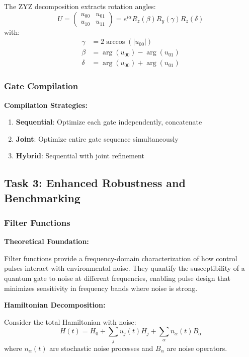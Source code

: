 \documentclass[11pt,a4paper]{article}
\theoremstyle{definition}
\theoremstyle{remark}
\begin{document}
The ZYZ decomposition extracts rotation angles:
\begin{equation}
U = \begin{pmatrix} u_{00} & u_{01} \\ u_{10} & u_{11} \end{pmatrix} = e^{i\alpha}R_z(\beta)R_y(\gamma)R_z(\delta)
\end{equation}
with:
\begin{align}
\gamma &= 2\arccos(|u_{00}|) \\
\beta &= \arg(u_{00}) - \arg(u_{01}) \\
\delta &= \arg(u_{00}) + \arg(u_{01})
\end{align}

\subsubsection{Gate Compilation}

\textbf{Compilation Strategies:}
\begin{enumerate}
    \item \textbf{Sequential}: Optimize each gate independently, concatenate
    \item \textbf{Joint}: Optimize entire gate sequence simultaneously
    \item \textbf{Hybrid}: Sequential with joint refinement
\end{enumerate}

\subsection{Task 3: Enhanced Robustness and Benchmarking}

\subsubsection{Filter Functions}

\textbf{Theoretical Foundation:}

Filter functions provide a frequency-domain characterization of how control pulses interact with environmental noise. They quantify the susceptibility of a quantum gate to noise at different frequencies, enabling pulse design that minimizes sensitivity in frequency bands where noise is strong.

\textbf{Hamiltonian Decomposition:}

Consider the total Hamiltonian with noise:
\begin{equation}
H(t) = H_0 + \sum_j u_j(t) H_j + \sum_\alpha n_\alpha(t) B_\alpha
\end{equation}
where $n_\alpha(t)$ are stochastic noise processes and $B_\alpha$ are noise operators.
\end{document}
